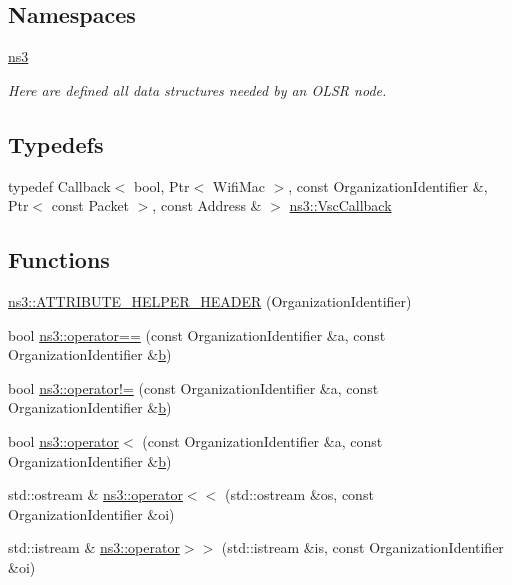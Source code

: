 \subsection*{Namespaces}
\begin{DoxyCompactItemize}
\item 
 \hyperlink{namespacens3}{ns3}
\begin{DoxyCompactList}\small\item\em Here are defined all data structures needed by an O\+L\+SR node. \end{DoxyCompactList}\end{DoxyCompactItemize}
\subsection*{Typedefs}
\begin{DoxyCompactItemize}
\item 
typedef Callback$<$ bool, Ptr$<$ Wifi\+Mac $>$, const Organization\+Identifier \&, Ptr$<$ const Packet $>$, const Address \& $>$ \hyperlink{namespacens3_acd51abe7aaf87942dfd56b0e5e1f899f}{ns3\+::\+Vsc\+Callback}
\end{DoxyCompactItemize}
\subsection*{Functions}
\begin{DoxyCompactItemize}
\item 
\hyperlink{namespacens3_aaa011dc918493ad3f5403b542adca359}{ns3\+::\+A\+T\+T\+R\+I\+B\+U\+T\+E\+\_\+\+H\+E\+L\+P\+E\+R\+\_\+\+H\+E\+A\+D\+ER} (Organization\+Identifier)
\item 
bool \hyperlink{namespacens3_a9e29113f13a2a1220c1c0a6fc5347a9e}{ns3\+::operator==} (const Organization\+Identifier \&a, const Organization\+Identifier \&\hyperlink{lte__pathloss_8m_a21ad0bd836b90d08f4cf640b4c298e7c}{b})
\item 
bool \hyperlink{namespacens3_a64cae6c5e3aa1167d01e2277852dd5c4}{ns3\+::operator!=} (const Organization\+Identifier \&a, const Organization\+Identifier \&\hyperlink{lte__pathloss_8m_a21ad0bd836b90d08f4cf640b4c298e7c}{b})
\item 
bool \hyperlink{namespacens3_ae4c8c7458287a990226d5bc119b95540}{ns3\+::operator$<$} (const Organization\+Identifier \&a, const Organization\+Identifier \&\hyperlink{lte__pathloss_8m_a21ad0bd836b90d08f4cf640b4c298e7c}{b})
\item 
std\+::ostream \& \hyperlink{namespacens3_a37adfb11e72f1c6473c5e3883906aa32}{ns3\+::operator$<$$<$} (std\+::ostream \&os, const Organization\+Identifier \&oi)
\item 
std\+::istream \& \hyperlink{namespacens3_a63bb3586b7d2f668b0ebf0abad4774c7}{ns3\+::operator$>$$>$} (std\+::istream \&is, const Organization\+Identifier \&oi)
\end{DoxyCompactItemize}
